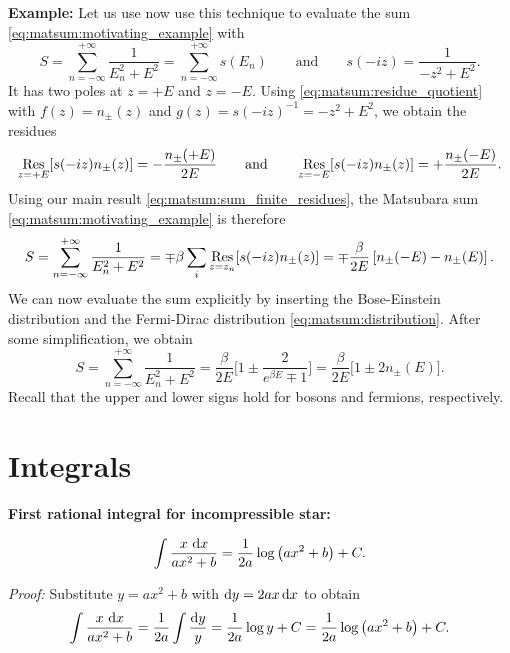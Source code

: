 \textbf{Example:}
Let us use now use this technique to evaluate the sum \eqref{eq:matsum:motivating_example} with
\begin{equation}
	S = \sum_{n=-\infty}^{+\infty} \frac{1}{E_n^2 + E^2}
	  = \sum_{n=-\infty}^{+\infty} s(E_n)
	\qquad \text{and} \qquad
	s(-iz) = \frac{1}{-z^2 + E^2} .
\end{equation}
It has two poles at $z = +E$ and $z = -E$.
Using \cref{eq:matsum:residue_quotient} with $f(z) = n_\pm(z)$ and $g(z) = s(-iz)^{-1} = -z^2 + E^2$, we obtain the residues
\begin{equation}
	\operatorname*{Res}_{z = +E}[s(-iz) n_\pm(z)] = -\frac{n_\pm(+E)}{2 E}  
	\qquad \text{and} \qquad
	\operatorname*{Res}_{z = -E}[s(-iz) n_\pm(z)] = +\frac{n_\pm(-E)}{2 E}  .
\end{equation}
Using our main result \eqref{eq:matsum:sum_finite_residues}, the Matsubara sum \eqref{eq:matsum:motivating_example} is therefore
\begin{equation}
	S = \sum_{n=-\infty}^{+\infty} \frac{1}{E_n^2 + E^2}
	  = \mp \beta \sum_i \operatorname*{Res}_{z=z_n}[s(-i z) n_\pm(z)]
	  = \mp \frac{\beta}{2 E} \left[ n_\pm(-E) - n_\pm(E) \right] .
\end{equation}
We can now evaluate the sum explicitly by inserting the Bose-Einstein distribution and the Fermi-Dirac distribution \eqref{eq:matsum:distribution}.
After some simplification, we obtain
\begin{equation}
	S = \sum_{n=-\infty}^{+\infty} \frac{1}{E_n^2 + E^2}
	  = \frac{\beta}{2 E} \bigg[ 1 \pm \frac{2}{e^{\beta E} \mp 1} \bigg]
	  = \frac{\beta}{2 E} \bigg[ 1 \pm 2 n_\pm(E) \bigg] .
\label{eq:matsum:example_result}
\end{equation}
Recall that the upper and lower signs hold for bosons and fermions, respectively.

\chapter{Integrals}
\label{chap:integrals}

\newcommand\formulawithcomment[4]{%
\textbf{#1:}
#2
\textit{#3:} #4
}

\newcommand\formulawithproof[3]{\formulawithcomment{#1}{#2}{Proof}{#3}}
\newcommand\formulawithreference[3]{\formulawithcomment{#1}{#2}{Reference}{#3}}

\formulawithproof{First rational integral for incompressible star}{
\begin{equation}
	\int \frac{x \, \mathop{}\!\mathrm{d} x}{ax^2 + b} = \frac{1}{2a} \log \left( a x^2 + b \right) + C .
	\label{eq:integrals:logarithm_xnum}
\end{equation}
}{
	Substitute $y = a x^2 + b$ with $\mathop{}\!\mathrm{d} y = 2 a x \mathop{}\!\mathrm{d} x$ to obtain
	\begin{equation*}
		\int \frac{x \, \mathop{}\!\mathrm{d} x}{ax^2 + b} = \frac{1}{2a} \int \frac{\mathop{}\!\mathrm{d} y}{y} = \frac{1}{2a} \log y + C = \frac{1}{2a} \log \left( a x^2 + b \right) + C .
	\end{equation*}
}

